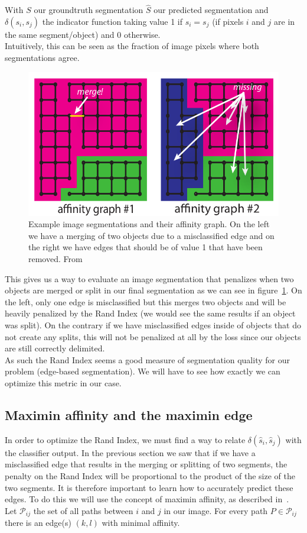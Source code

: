 With $S$ our groundtruth segmentation $\hat{S}$ our predicted segmentation and
$\delta(s_i,s_j)$ the indicator function taking value 1 if $s_i = s_j$ (if
pixels $i$ and $j$ are in the same segment/object) and 0 otherwise.\\
Intuitively, this can be seen as the fraction of image pixels where both
segmentations agree.

\begin{figure}[!htbp]
	\centering
	\includegraphics[width=0.45\linewidth]{./images/affinity_graphs.png}
	\caption{Example image segmentations and their affinity graph. On the left
	we have a merging of two objects due to a misclassified edge and on the
right we have edges that should be of value 1 that have been removed. From~\cite{turaga_maximin_2009}}%
	\label{fig:affinity_graphs}
\end{figure}

This gives us a way to evaluate an image segmentation that penalizes when two
objects are merged or split in our final segmentation as we can see in
figure~\ref{fig:affinity_graphs}. On the left, only one edge is misclassified
but this merges two objects and will be heavily penalized by the Rand Index (we
would see the same results if an object was split). On the contrary if we have
misclassified edges inside of objects that do not create any splits, this will
not be penalized at all by the loss since our objects are still correctly
delimited.\\

As such the Rand Index seems a good measure of segmentation quality for our
problem (edge-based segmentation). We will have to see how exactly we can
optimize this metric in our case.

\subsection{Maximin affinity and the maximin edge}

In order to optimize the Rand Index, we must find a way to relate
$\delta(\hat{s}_i,\hat{s}_j)$ with the classifier output.
In the previous section we saw that if we have a misclassified edge that results in the merging or splitting of two segments, the penalty on the Rand Index will be proportional to the product of the size of the two segments. 
It is therefore important to learn how to accurately predict these edges.
To do this we will use the concept of maximin
affinity, as described in~\cite{turaga_maximin_2009}.\\
Let $\mathcal{P}_{ij}$ the set of all paths between $i$ and $j$ in our image.
For every path $P\in\mathcal{P}_{ij}$ there is an edge(s) $(k,l)$ with minimal
affinity.\\

